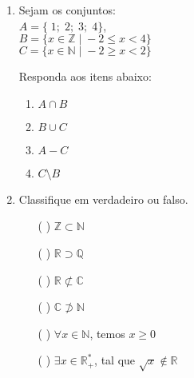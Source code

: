 \documentclass[12pt,a4paper]{article}
\begin{document}
    \begin{enumerate}
        \item Sejam os conjuntos: \\ $A = \{\;1;\;2;\;3;\;4\}$, \\ $B = \{x \in \mathbb{Z} \;|\; -2 \leq x < 4\}$ \\$C = \{x \in \mathbb{N} \;|\; -2 \geq x < 2\}$
        
        Responda aos itens abaixo:
        \begin{enumerate}
            \item $A \cap B$
            \item $B \cup C$
            \item $A - C$
            \item $C\setminus B$
        \end{enumerate}
        
        \item Classifique em verdadeiro ou falso.
        \begin{enumerate}
            \item[( )] $\mathbb{Z} \subset \mathbb{N}$
            \item[( )] $\mathbb{R} \supset \mathbb{Q}$
            \item[( )] $\mathbb{R} \not\subset \mathbb{C}$
            \item[( )] $\mathbb{C} \not\supset \mathbb{N}$
            \item[( )] $\forall x \in \mathbb{N}$, temos $x \geq 0$
            \item[( )] $\exists x \in \mathbb{R}^*_+$, tal que $\sqrt{x} \not\in\mathbb{R}$
        \end{enumerate}
    \end{enumerate}
\end{document}
